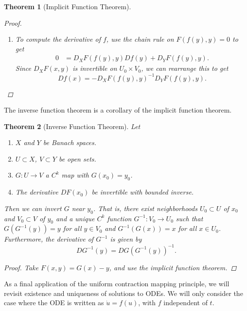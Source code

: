 \documentclass[12pt]{amsart}         %
\newtheorem{theorem}{Theorem}[section]
\theoremstyle{remark}
\begin{document}
\begin{theorem}[Implicit Function Theorem]
\begin{proof}
\begin{enumerate}
\item To compute the derivative of $f$, use the chain rule on $F(f(y), y) = 0$ to get
\begin{align*}
0 &= D_X F(f(y),y)Df(y) + D_Y F(f(y),y).
\end{align*}
Since $D_X F(x, y)$ is invertible on $U_0 \times V_0$, we can rearrange this to get
\[
Df(x) = -D_X F(f(y),y)^{-1} D_Y F(f(y),y).
\]
\end{enumerate}
\end{proof}
\end{theorem}

The inverse function theorem is a corollary of the implicit function theorem.

\begin{theorem}[Inverse Function Theorem]
Let
\begin{enumerate}
\item $X$ and $Y$ be Banach spaces.
\item $U \subset X$, $V \subset Y$ be open sets.
\item $G: U \rightarrow V$ a $C^k$ map with $G(x_0) = y_0$.
\item The derivative $D F(x_0)$ be invertible with bounded inverse.
\end{enumerate}
Then we can invert $G$ near $y_0$. That is, there exist neighborhoods $U_0 \subset U$ of $x_0$ and $V_0 \subset V$ of $y_0$ and a unique $C^k$ function $G^{-1}: V_0 \rightarrow U_0$ such that $G(G^{-1}(y)) = y$ for all $y \in V_0$ and $G^{-1}(G(x)) = x$ for all $x \in U_0$. Furthermore, the derivative of $G^{-1}$ is given by
\[
DG^{-1}(y) = D G( G^{-1}(y) )^{-1}.
\]

\begin{proof}
Take $F(x, y) = G(x) - y$, and use the implicit function theorem.
\end{proof}
\end{theorem}

As a final application of the uniform contraction mapping principle, we will revisit existence and uniqueness of solutions to ODEs. We will only consider the case where the ODE is written as $\dot{u} = f(u)$, with $f$ independent of $t$.
\end{document}
